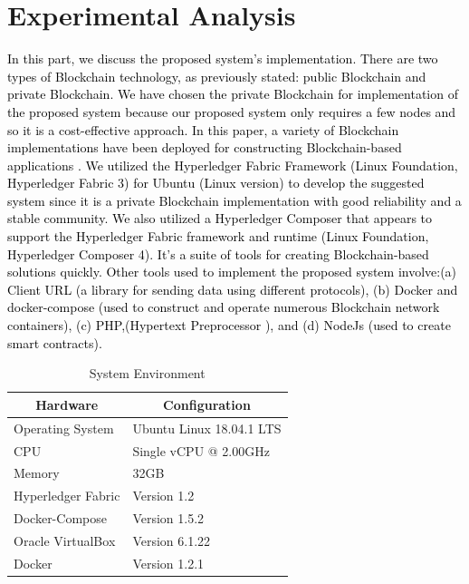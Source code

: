 \documentclass[12pt]{ucthesis}
\begin{document}
\section{ Experimental Analysis}
    \textcolor{black}{In this part, we discuss the proposed system's implementation. There are two types of Blockchain technology, as previously stated: public Blockchain and private Blockchain. We have chosen the private Blockchain for implementation of the proposed system because our proposed system only requires a few nodes and so it is a cost-effective approach. In this paper, a variety of Blockchain implementations have been deployed for constructing Blockchain-based applications \cite{refAHW,biswas2021landchain,mukherjee2020hyper,al2021towards,9642537,biswas2022drlas,mist2021,rabbi2021bls,sticounterfeit2021,ahmed2021dbst,biswas2021biot,ahamed2021bps}. We utilized the Hyperledger Fabric Framework (Linux Foundation, Hyperledger Fabric 3) for Ubuntu (Linux version) to develop the suggested system since it is a private Blockchain implementation with good reliability and a stable community.
We also utilized a Hyperledger Composer that appears to support the Hyperledger Fabric framework and runtime (Linux Foundation, Hyperledger Composer 4). It's a suite of tools for creating Blockchain-based solutions quickly. Other tools used to implement the proposed system involve:(a) Client URL (a library for sending data using different protocols), (b) Docker and docker-compose (used to construct and operate numerous Blockchain network containers), (c) PHP,(Hypertext Preprocessor ), and (d) NodeJs (used to create smart contracts).
 }

\begin{table}[t!]
\caption{System Environment}
\centering
\begin{tabular}{|l|l|}
\hline
\multicolumn{1}{|c|}{{  Hardware}} & \multicolumn{1}{|c|}{{  Configuration}} \\ \hline
{  Operating System}             & {  Ubuntu Linux 18.04.1 LTS}          \\
{  CPU}                & {  Single vCPU @ 2.00GHz} \\
{  Memory}             & {  32GB}                  \\
{  Hyperledger Fabric} & {  Version 1.2}           \\
{  Docker-Compose}     & {  Version 1.5.2}         \\
{  Oracle VirtualBox}  & {  Version 6.1.22}        \\
{  Docker}             & {  Version 1.2.1}         \\ \hline
\end{tabular}
\label{tab2}
\vspace{-2mm}
\end{table}
\end{document}
